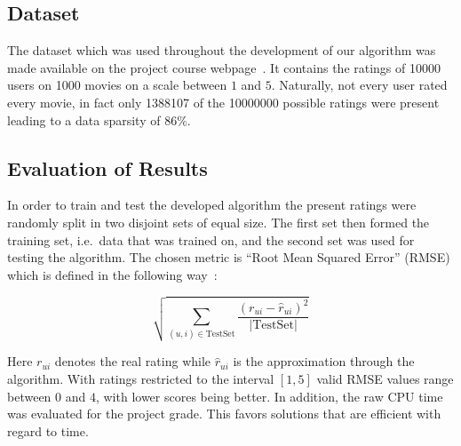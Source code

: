 \documentclass[10pt,conference,compsocconf]{IEEEtran}
\newcommand{\abs}[1]{\left\lvert#1\right\rvert}
\begin{document}


\subsection{Dataset}
\label{sub:dataset}

The dataset which was used throughout the development of our algorithm was made
available on the project course webpage~\cite{lab2015collaborative}. It contains
the ratings of \num{10000} users on \num{1000} movies on a scale between $1$ and
$5$. Naturally, not every user rated every movie, in fact only \num{1388107} of
the \num{10000000} possible ratings were present leading to a data sparsity of
$86\%$.

\subsection{Evaluation of Results}
\label{sub:evaluation_of_results}

In order to train and test the developed algorithm the present ratings were
randomly split in two disjoint sets of equal size. The first set then formed
the training set, i.e.\ data that was trained on, and the second set was used
for testing the algorithm. The chosen metric is ``Root Mean Squared Error''
(RMSE) which is defined in the following way~\cite{koren2008factorization,
  koren2010factor, koren2011advances}:

\begin{equation}
  \sqrt{\sum_{(u,i) \in \mathrm{TestSet}}
    \frac{{(r_{ui} - \hat{r}_{ui})}^2}{\abs{\mathrm{TestSet}}}}
\end{equation}

Here $r_{ui}$ denotes the real rating while $\hat{r}_{ui}$ is the approximation
through the algorithm. With ratings restricted to the interval $[1,5]$ valid
RMSE values range between $0$ and $4$, with lower scores being better. In
addition, the raw CPU time was evaluated for the project grade. This favors
solutions that are efficient with regard to time.
\end{document}
